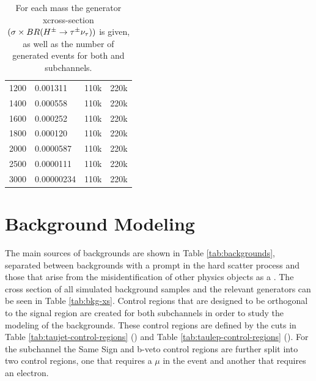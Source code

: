\begin{table}[!thp]
{\begin{tabular}{| l | l | l | l |}
			1200 			& 0.001311 			& 110k 						& 220k							\\
			1400 			& 0.000558 			& 110k 						& 220k							\\
			1600 			& 0.000252 			& 110k 						& 220k							\\
			1800 			& 0.000120 			& 110k 						& 220k							\\
			2000 			& 0.0000587 		& 110k 						& 220k							\\
			2500 			& 0.0000111			& 110k 						& 220k							\\
			3000 			& 0.00000234		& 110k 						& 220k							\\ \hline
			\end{tabular}}
			\caption{For each \Hpm mass the generator xcross-section $(\sigma \times BR(H^{\pm} \rightarrow \tau^{\pm} \nu_{\tau}))$ is given, as well as the number of generated events for both \taulep and \taujets subchannels.}
			\label{tab:signal-generated}
		\end{table}

	\section{Background Modeling}\label{sec:bkg-modeling}
		The main sources of backgrounds are shown in Table \ref{tab:backgrounds}, separated between backgrounds with a prompt \tauhad in the hard scatter process and those that arise from the misidentification of other physics objects as a \tauhad. The cross section of all simulated background samples and the relevant generators can be seen in Table \ref{tab:bkg-xs}. Control regions that are designed to be orthogonal to the signal region are created for both subchannels in order to study the modeling of the backgrounds. These control regions are defined by the cuts in Table \ref{tab:taujet-control-regions} (\taujets) and Table \ref{tab:taulep-control-regions} (\taulep). For the \taulep subchannel the Same Sign and b-veto control regions are further split into two control regions, one that requires a $\mu$ in the event and another that requires an electron. 

		

    \begin{table}[!thp]
      \centering
      \caption{Dominant backgrounds from prompt \tauhad and fake \tauhad candidates.}
      \label{tab:backgrounds}
    \end{table}

